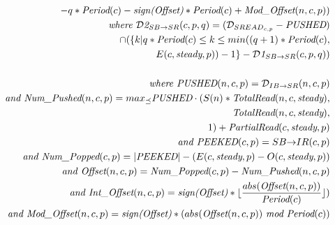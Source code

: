 \begin{itemize}
\begin{align*}
                   - q * \mt{Period}(c) 
                   - \mt{sign(Offset)} * \mt{Period}(c) + \mt{Mod\_Offset}(n,c,p)) \\
\mt{where }{{\cal D}\mt{2}}_{SB {\small \rightarrow} SR}(c,p,q) = 
  ({\cal D}_{{SREAD}_{c, p}} - \mt{PUSHED}) \\
                         \cap ( \{ k | q * \mt{Period}(c)
                                      \le k 
                                      \le min((q+1)*\mt{Period}(c),  \\
                                              E(c, \mt{steady}, p)) - 1 \} - {{\cal D}\mt{1}}_{SB {\small \rightarrow} SR}(c,p,q) ) \\ ~ \\
%
%
\mt{where }\mt{PUSHED}(n,c,p) = {\cal D}_{IB {\small \rightarrow} SR}(n,c,p) \\
\mt{and }\mt{Num\_Pushed}(n,c,p) = 
  max_{\preceq}\mt{PUSHED} \cdot (S(n) * \mt{TotalRead}(n,c,\mt{steady}), \\
                                        \mt{TotalRead}(n,c,\mt{steady}), \\
                                        1 ) + \mt{PartialRead}(c, \mt{steady}, p) \\
\mt{and }\mt{PEEKED}(c,p) = {SB {\small \rightarrow} IR}(c,p) \\
\mt{and }\mt{Num\_Popped}(c,p) = |\mt{PEEKED}| - (E(c,\mt{steady},p) - O(c,\mt{steady},p)) \\
\mt{and }\mt{Offset}(n,c,p) = \mt{Num\_Popped}(c,p)-\mt{Num\_Pushed}(n,c,p) \\
\mt{and }\mt{Int\_Offset}(n,c,p) = \mt{sign(Offset)}*\lfloor \frac{abs(\mt{Offset}(n,c,p))}{\mt{Period}(c)} \rfloor) \\
\mt{and }\mt{Mod\_Offset}(n,c,p) = \mt{sign(Offset)}*(abs(\mt{Offset}(n,c,p))~\mt{mod}~\mt{Period}(c)) \\
%
\end{align*}
%
\end{itemize}

